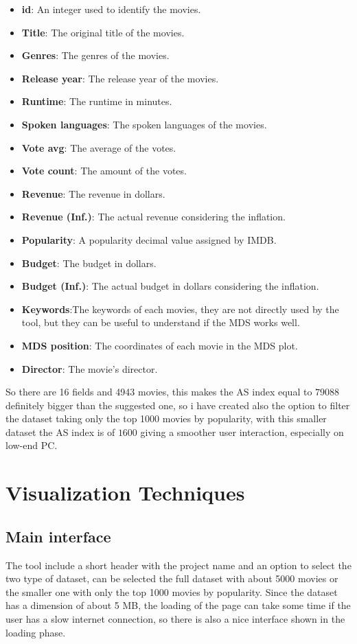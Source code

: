 \documentclass[]{article}
\begin{document}
\begin{itemize}
	\item \textbf{id}: An integer used to identify the movies.
	\item \textbf{Title}: The original title of the movies.
	\item \textbf{Genres}: The genres of the movies.
	\item \textbf{Release year}: The release year of the movies.
	\item \textbf{Runtime}: The runtime in minutes.
	\item \textbf{Spoken languages}: The spoken languages of the movies.
	\item \textbf{Vote avg}: The average of the votes.
	\item \textbf{Vote count}: The amount of the votes.
	\item \textbf{Revenue}: The revenue in dollars.
	\item \textbf{Revenue (Inf.)}: The actual revenue considering the inflation.
	\item \textbf{Popularity}: A popularity decimal value assigned by IMDB.
	\item \textbf{Budget}: The budget in dollars.
	\item \textbf{Budget (Inf.)}: The actual budget in dollars considering the inflation.
	\item \textbf{Keywords}:The keywords of each movies, they are not directly used by the tool, but they can be useful to understand if the MDS works well.
	\item \textbf{MDS position}: The coordinates of each movie in the MDS plot.
	\item \textbf{Director}: The movie's director.
\end{itemize}
So there are 16 fields and 4943 movies, this makes the AS index equal to $79088$ definitely bigger than the suggested one, so i have created also the option to filter the dataset taking only the top 1000 movies by popularity, with this smaller dataset the AS index is of $1600$ giving a smoother user interaction, especially on low-end PC.\newline
\section{Visualization Techniques}
\subsection{Main interface}
The tool include a short header with the project name and an option to select the two type of dataset, can be selected the full dataset with about 5000 movies or the smaller one with only the top 1000 movies by popularity.\newline
Since the dataset has a dimension of about 5 MB, the loading of the page can take some time if the user has a slow internet connection, so there is also a nice interface shown in the loading phase.
\end{document}
